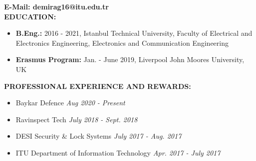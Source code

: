 \vspace{-3mm}
\textbf{E-Mail: {\normalfont demirag16@itu.edu.tr}} \\


\textbf{EDUCATION:}
\vspace{-3mm}
\begin{itemize}
  \item \textbf{B.Eng.:} 2016 - 2021, Istanbul Technical University, Faculty of Electrical and Electronics Engineering, Electronics and Communication Engineering
  \item \textbf{Erasmus Program:} Jan. - June 2019, Liverpool John Moores University, UK
\end{itemize}

\textbf{PROFESSIONAL EXPERIENCE AND REWARDS:}
\vspace{-3mm}
\begin{itemize}
  \item Baykar Defence \hfill \textit{Aug 2020 - Present}
  \item Ravinspect Tech \hfill \textit{July 2018 - Sept. 2018}
  \item DESI Security \& Lock Systems \hfill \textit{July 2017 - Aug. 2017}
  \item ITU Department of Information Technology \hfill \textit{Apr. 2017 - July 2017}
\end{itemize}


\vspace{-3mm}

\newpage

\vspace{10mm}

\newsavebox{\mysquare}
\savebox{\mysquare}{\textcolor{black}{\rule[2.3pt]{3.4pt}{3.4pt}}}

\setlength{\TPHorizModule}{10pt}
\setlength{\TPVertModule}{10pt}

